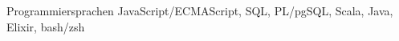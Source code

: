 \cvitem
{
  Programmier\-sprachen
}
{
  JavaScript/ECMAScript, SQL, PL/pgSQL, Scala, Java, Elixir, bash/zsh
}
